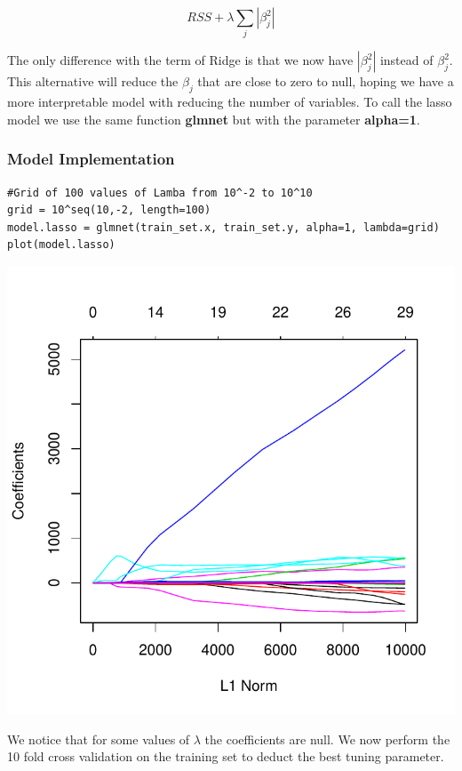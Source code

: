\documentclass[]{report}
\begin{document}
\begin{equation} \label{eq2}
RSS + \lambda \sum_{j}{|\beta_{j}^{2}|}
\end{equation}	

The only difference with the term of Ridge is that we now have $|\beta_{j}^{2}|$ instead of $\beta_{j}^{2}$. This alternative will reduce the $\beta_{j}$ that are close to zero to null, hoping we have a more interpretable model with reducing the number of variables. To call the lasso model we use the same function \textbf{glmnet} but with the parameter \textbf{alpha=1}.

\subsubsection{Model Implementation}
\begin{lstlisting}
#Grid of 100 values of Lamba from 10^-2 to 10^10
grid = 10^seq(10,-2, length=100)
model.lasso = glmnet(train_set.x, train_set.y, alpha=1, lambda=grid)
plot(model.lasso)
\end{lstlisting}

\begin{center}
	\includegraphics[width=0.8\linewidth]{Figures/lasso_model.pdf}
\end{center}

We notice that for some values of $\lambda$ the coefficients are null. We now perform the 10 fold cross validation on the training set to deduct the best tuning parameter.
\end{document}
